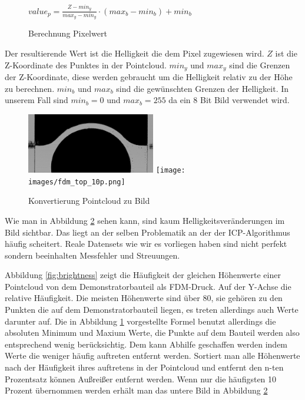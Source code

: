 \documentclass[../main.tex]{subfiles}
\begin{document}
\begin{figure}
    \centering
    $value_p = \frac{Z - min_y}{max_y - min_y} \cdot (max_b - min_b) + min_b$
    \caption{Berechnung Pixelwert}
    \label{calc:brightness}
\end{figure}
Der resultierende Wert ist die Helligkeit die dem Pixel zugewiesen wird.
$Z$ ist die Z-Koordinate des Punktes in der Pointcloud. $min_y$ und $max_y$ sind 
die Grenzen der Z-Koordinate, diese werden gebraucht um die Helligkeit relativ 
zu der Höhe zu berechnen. $min_b$ und $max_b$ sind die gewünschten Grenzen der 
Helligkeit. In unserem Fall sind $min_b = 0$ und $max_b = 255$ da ein 8 Bit Bild
verwendet wird.

\begin{figure}
    \centering
    \includegraphics[width=0.5\textwidth]{images/fdm_top_100p.png}
    \texttt{[image: images/fdm\_top\_10p.png]}
    \caption{Konvertierung Pointcloud zu Bild}
    \label{fig:image_from_pc}
\end{figure}

Wie man in Abbildung \ref{fig:image_from_pc} sehen kann, sind kaum Helligkeitsveränderungen
im Bild sichtbar. Das liegt an der selben Problematik an der der ICP-Algorithmus häufig
scheitert. Reale Datensets wie wir es vorliegen haben sind nicht perfekt sondern
beeinhalten Messfehler und Streuungen. 

Abbildung \ref*{fig:brightness} zeigt die Häufigkeit der gleichen Höhenwerte einer
Pointcloud von dem Demonstratorbauteil als FDM-Druck.
 Auf der Y-Achse die relative Häufigkeit.
Die meisten Höhenwerte sind über 80, sie gehören zu den Punkten die auf dem 
Demonstratorbauteil liegen, es treten allerdings auch Werte darunter auf. 
Die in Abbildung \ref*{calc:brightness} vorgestellte Formel benutzt allerdings die absoluten
Minimum und Maxium Werte, die Punkte auf dem Bauteil werden also entsprechend wenig
berücksichtig. Dem kann Abhilfe geschaffen werden indem Werte die weniger häufig 
auftreten entfernt werden. Sortiert man alle Höhenwerte nach der Häufigkeit ihres 
auftretens in der Pointcloud und entfernt den n-ten Prozentsatz können Außreißer 
entfernt werden. Wenn nur die häufigsten 10 Prozent übernommen werden erhält man 
das untere Bild in Abbildung \ref{fig:image_from_pc}
\end{document}
